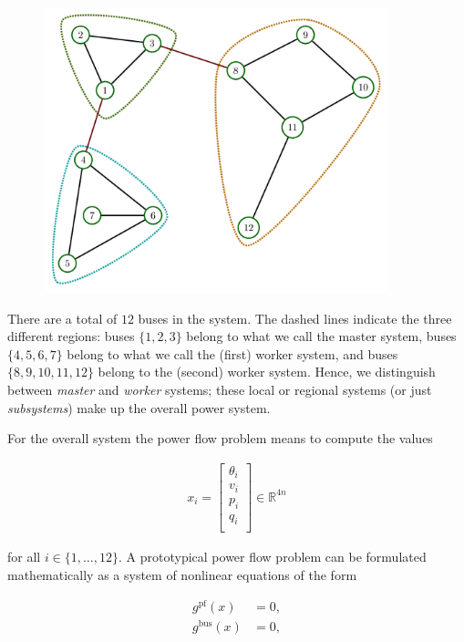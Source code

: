 \documentclass{article}
\newcommand{\n}{n}
\newcommand{\state}{x}
\newcommand{\pf}{g^{\text{pf}}}
\newcommand{\busspecs}{g^{\text{bus}}}
\begin{document}
\begin{figure}
    \includegraphics[width=10cm]{visualization/original.png}
\end{figure}

There are a total of $12$ buses in the system.
The dashed lines indicate the three different regions: buses $\{ 1, 2, 3 \}$ belong to what we call the master system, buses $\{4, 5, 6, 7 \}$ belong to what we call the (first) worker system, and buses $\{ 8, 9, 10, 11, 12 \}$ belong to the (second) worker system.
Hence, we distinguish between \emph{master} and \emph{worker} systems; these local or regional systems (or just \emph{subsystems}) make up the overall power system.

For the overall system the power flow problem means to compute the values

\begin{align}
    \state_i = \begin{bmatrix}
        \theta_i \\
        v_i \\
        p_i \\
        q_i \\
    \end{bmatrix}
    \in \mathbb{R}^{4 \n}
\end{align}

for all $i \in \{1, \dots, 12 \}$.
A prototypical power flow problem can be formulated mathematically as a system of nonlinear equations of the form

\begin{subequations}
    \begin{align}
        \pf( \state ) &= 0, \\
        \busspecs ( \state ) &= 0,
    \end{align}
\end{subequations}
\end{document}
